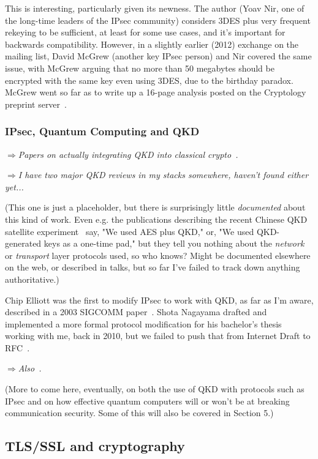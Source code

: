 \documentclass[%
 aip,
 jmp,%
 amsmath,amssymb,
 reprint,%
]{revtex4-1}
\def\comment#1{{\color{ForestGreen}$\Rightarrow${\small\em #1}}}
\begin{document}
This is interesting, particularly given its newness.  The author (Yoav
Nir, one of the long-time leaders of the IPsec community) considers
3DES plus very frequent rekeying to be sufficient, at least for some use
cases, and it's important for backwards compatibility.  However, in a
slightly earlier (2012) exchange on the mailing list, David McGrew
(another key IPsec person) and Nir covered the same issue, with McGrew
arguing that no more than 50 megabytes should be encrypted with the
same key even using 3DES, due to the birthday paradox.  McGrew went so
far as to write up a 16-page analysis posted on the Cryptology
preprint server~\cite{cryptoeprint:2012:623}.

\subsubsection{IPsec, Quantum Computing and QKD}

\comment{Papers on actually integrating QKD into classical crypto~\cite{Alleaume201462,mink09:_qkd_and_ipsec}.}

\comment{I have two major QKD reviews in my stacks somewhere, haven't
  found either yet...}

(This one is just a placeholder, but there is surprisingly little
\emph{documented} about this kind of work.  Even e.g. the publications
describing the recent Chinese QKD satellite
experiment~\cite{PhysRevLett.120.030501} say, "We used AES plus QKD,"
or, "We used QKD-generated keys as a one-time pad," but they tell you
nothing about the \emph{network} or \emph{transport} layer protocols
used, so who knows?  Might be documented elsewhere on the web, or
described in talks, but so far I've failed to track down anything
authoritative.)

Chip Elliott was the first to modify IPsec to work with QKD, as far as
I'm aware, described in a 2003 SIGCOMM paper~\cite{elliott:qkd-net}.
Shota Nagayama drafted and implemented a more formal protocol
modification for his bachelor's thesis working with me, back in 2010,
but we failed to push that from Internet Draft to
RFC~\cite{nagayama12:_ike_for_ipsec_with_qkd}.

\comment{Also~\cite{tanizawa2016secure}.}

(More to come here, eventually, on both the use of QKD with protocols
such as IPsec and on how effective quantum computers will or won't be
at breaking communication security.  Some of this will also be covered
in Section 5.)

\subsection{TLS/SSL and cryptography}
\label{sec:tls}
\end{document}
